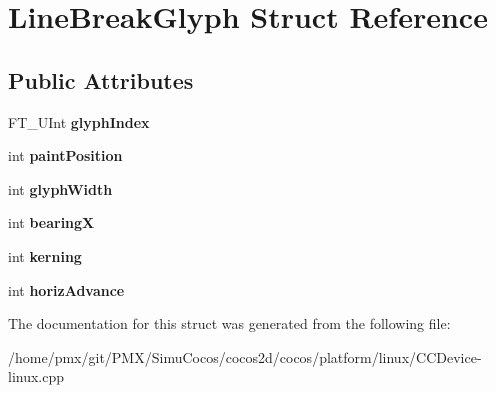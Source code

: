 \hypertarget{structLineBreakGlyph}{}\section{Line\+Break\+Glyph Struct Reference}
\label{structLineBreakGlyph}
\subsection*{Public Attributes}
\begin{DoxyCompactItemize}
\item 
\mbox{\label{structLineBreakGlyph_ad9f6d726910e3622642f0453e6ea12f4}} 
F\+T\+\_\+\+U\+Int {\bfseries glyph\+Index}
\item 
\mbox{\label{structLineBreakGlyph_a942856e6900d1174d62fd1ed04dba332}} 
int {\bfseries paint\+Position}
\item 
\mbox{\label{structLineBreakGlyph_abbf7d242c4a99b583bf129f25ce96145}} 
int {\bfseries glyph\+Width}
\item 
\mbox{\label{structLineBreakGlyph_a3391695f89bdfdf2d873db936d5e1c71}} 
int {\bfseries bearingX}
\item 
\mbox{\label{structLineBreakGlyph_a67a363fcdaa39fd8783ca49d5b94bdb5}} 
int {\bfseries kerning}
\item 
\mbox{\label{structLineBreakGlyph_ad0e89f1a69a45002270282ffe459c5eb}} 
int {\bfseries horiz\+Advance}
\end{DoxyCompactItemize}


The documentation for this struct was generated from the following file\+:\begin{DoxyCompactItemize}
\item 
/home/pmx/git/\+P\+M\+X/\+Simu\+Cocos/cocos2d/cocos/platform/linux/C\+C\+Device-\/linux.\+cpp\end{DoxyCompactItemize}
